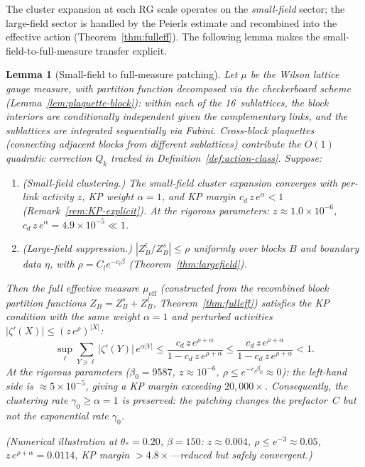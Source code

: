 \documentclass[11pt]{article}
\newtheorem{lemma}[theorem]{Lemma}
\theoremstyle{definition}
\begin{document}
The cluster expansion at each RG scale operates on the
\emph{small-field} sector; the large-field sector is handled by
the Peierls estimate and recombined into the effective action
(Theorem~\ref{thm:fulleff}).  The following lemma makes the
small-field-to-full-measure transfer explicit.

\begin{lemma}[Small-field to full-measure patching]%
\label{lem:patch}
Let $\mu$ be the Wilson lattice gauge measure,
with partition function decomposed via the checkerboard
scheme (Lemma~\ref{lem:plaquette-block}): within each of
the 16~sublattices, the block interiors are conditionally
independent given the complementary links, and the
sublattices are integrated sequentially via Fubini.
Cross-block plaquettes (connecting adjacent blocks from
different sublattices) contribute the $O(1)$ quadratic
correction $Q_k$ tracked in Definition~\ref{def:action-class}.
Suppose:
\begin{enumerate}[nosep,label=(\roman*)]
\item \emph{(Small-field clustering.)}  The small-field
cluster expansion converges with per-link activity $z$,
KP weight $\alpha=1$, and KP margin
$c_d\,z\,e^\alpha<1$
(Remark~\ref{rem:KP-explicit}).
At the rigorous parameters: $z\approx 1.0\times 10^{-6}$,
$c_d\,z\,e^\alpha=4.9\times 10^{-5}\ll 1$.
\item \emph{(Large-field suppression.)}
$|Z_B^l/Z_B^s|\le\rho$ uniformly over blocks $B$ and
boundary data $\eta$, with $\rho=C_l e^{-c_l\beta}$
(Theorem~\ref{thm:largefield}).
\end{enumerate}
Then the full effective measure $\mu_{\mathrm{eff}}$
(constructed from the recombined block partition functions
$Z_B=Z_B^s+Z_B^l$, Theorem~\ref{thm:fulleff}) satisfies the
KP condition with the same weight $\alpha=1$ and
perturbed activities $|\zeta'(X)|\le(z\,e^\rho)^{|X|}$:
\begin{equation}\label{eq:KP-perturbed}
\sup_\ell\sum_{Y\ni\ell}|\zeta'(Y)|\,e^{\alpha|Y|}
\le\frac{c_d\,z\,e^{\rho+\alpha}}{1-c_d\,z\,e^{\rho+\alpha}}
\le\frac{c_d\,z\,e^{\rho+\alpha}}{1-c_d\,z\,e^{\rho+\alpha}}
<1.
\end{equation}
At the rigorous parameters ($\beta_0=9587$, $z\approx 10^{-6}$,
$\rho\le e^{-c_l\beta_0}\approx 0$): the left-hand side is
$\approx 5\times 10^{-5}$, giving a KP margin exceeding
$20{,}000\times$.
Consequently, the clustering rate $\gamma_0\ge\alpha=1$
is \emph{preserved}: the patching changes the prefactor~$C$
but not the exponential rate $\gamma_0$.

\emph{(Numerical illustration at $\theta_*=0.20$, $\beta=150$:
$z\approx 0.004$, $\rho\le e^{-3}\approx 0.05$,
$z\,e^{\rho+\alpha}=0.0114$, KP margin $>4.8\times$---reduced
but safely convergent.)}
\end{lemma}
\end{document}
